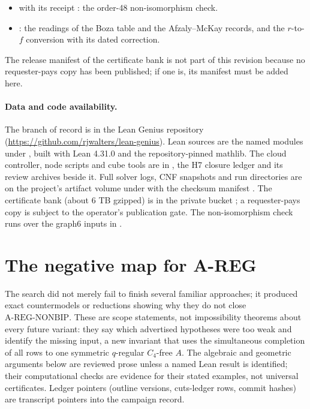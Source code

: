 \documentclass{anvil-paper}
\newcommand{\NONBIP}{\mathrm{A\text{-}REG\text{-}NONBIP}}
\theoremstyle{definition}
\begin{document}
\begin{itemize}
\item {} with its receipt : the order-48 non-isomorphism check.
\item {}: the readings of the Boza table and the Afzaly--McKay records, and the $r$-to-$f$ conversion with its dated correction.
\end{itemize}
The release manifest of the certificate bank is not part of this revision because no requester-pays copy has been published; if one is, its manifest must be added here.

\paragraph{Data and code availability.} The branch of record is  in the Lean Genius repository (\url{https://github.com/rjwalters/lean-genius}). Lean sources are the named modules under , built with Lean 4.31.0 and the repository-pinned mathlib. The cloud controller, node scripts and cube tools are in , the H7 closure ledger and its review archives beside it. Full solver logs, CNF snapshots and run directories are on the project's artifact volume under  with the checksum manifest . The certificate bank (about 6 TB gzipped) is in the private bucket ; a requester-pays copy is subject to the operator's publication gate. The non-isomorphism check runs over the graph6 inputs in .

\appendix

\section{The negative map for A-REG}\label{app:negative}

The search did not merely fail to finish several familiar approaches; it produced exact countermodels or reductions showing why they do not close $\NONBIP$. These are scope statements, not impossibility theorems about every future variant: they say which advertised hypotheses were too weak and identify the missing input, a new invariant that uses the simultaneous completion of all rows to one symmetric $q$-regular $C_4$-free $A$. The algebraic and geometric arguments below are reviewed prose unless a named Lean result is identified; their computational checks are evidence for their stated examples, not universal certificates. Ledger pointers (outline versions, cuts-ledger rows, commit hashes) are transcript pointers into the campaign record.
\end{document}
